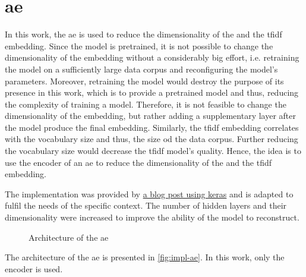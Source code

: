 \section{\acl{ae}}\label{subsec:impl-autoencoder}

In this work, the \ac{ae} is used to reduce the dimensionality of the \infersent{} and the \ac{tfidf} embedding.
Since the \infersent{} model is pretrained, it is not possible to change the dimensionality of the embedding without a considerably big effort,
i.e. retraining the model on a sufficiently large data corpus and reconfiguring the model's parameters.
Moreover, retraining the model would destroy the purpose of its presence in this work, which is to provide a pretrained model and thus, 
reducing the complexity of training a model.
Therefore, it is not feasible to change the dimensionality of the \infersent{} embedding, but rather adding a supplementary layer after the model 
produce the final embedding.
Similarly, the \ac{tfidf} embedding correlates with the vocabulary size and thus, the size od the data corpus.
Further reducing the vocabulary size would decrease the \ac{tfidf} model's quality.
Hence, the idea is to use the encoder of an \ac{ae} to reduce the dimensionality of the \infersent{} and the \ac{tfidf} embedding.

The implementation was provided by 
\href{https://blog.paperspace.com/autoencoder-image-compression-keras/}{a blog post using keras}
and is adapted to fulfil the needs of the specific context.
The number of hidden layers and their dimensionality were increased to improve the ability of the model to reconstruct.

%     

\begin{figure}[h] %
    \centering
    
    \caption{Architecture of the \ac{ae}}
    \label{fig:impl-ae}
\end{figure}

The architecture of the \ac{ae} is presented in \autoref{fig:impl-ae}.
In this work, only the encoder is used.